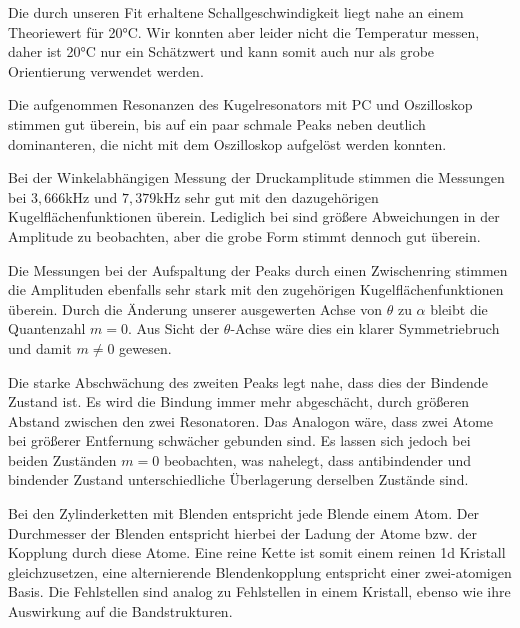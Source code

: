 Die durch unseren Fit erhaltene Schallgeschwindigkeit liegt nahe an einem Theoriewert für 20°C.
Wir konnten aber leider nicht die Temperatur messen, daher ist 20°C nur ein Schätzwert und kann somit auch nur als grobe Orientierung verwendet werden.

Die aufgenommen Resonanzen des Kugelresonators mit PC und Oszilloskop stimmen gut überein, bis auf ein paar schmale Peaks neben deutlich dominanteren, die nicht mit dem Oszilloskop aufgelöst werden konnten.

Bei der Winkelabhängigen Messung der Druckamplitude stimmen die Messungen bei $3,666$kHz und $7,379$kHz sehr gut mit den dazugehörigen Kugelflächenfunktionen überein.
Lediglich bei sind größere Abweichungen in der Amplitude zu beobachten, aber die grobe Form stimmt dennoch gut überein.

Die Messungen bei der Aufspaltung der Peaks durch einen Zwischenring stimmen die Amplituden ebenfalls sehr stark mit den zugehörigen Kugelflächenfunktionen überein.
Durch die Änderung unserer ausgewerten Achse von $\theta$ zu $\alpha$ bleibt die Quantenzahl $m=0$.
Aus Sicht der $\theta$-Achse wäre dies ein klarer Symmetriebruch und damit $m\neq 0$ gewesen.

Die starke Abschwächung des zweiten Peaks legt nahe, dass dies der Bindende Zustand ist.
Es wird die Bindung immer mehr abgeschächt, durch größeren Abstand zwischen den zwei Resonatoren.
Das Analogon wäre, dass zwei Atome bei größerer Entfernung schwächer gebunden sind.
Es lassen sich jedoch bei beiden Zuständen $m=0$ beobachten, was nahelegt, dass antibindender und bindender Zustand unterschiedliche Überlagerung derselben Zustände sind.

Bei den Zylinderketten mit Blenden entspricht jede Blende einem Atom.
Der Durchmesser der Blenden entspricht hierbei der Ladung der Atome bzw. der Kopplung durch diese Atome.
Eine reine Kette ist somit einem reinen 1d Kristall gleichzusetzen, eine alternierende Blendenkopplung entspricht einer zwei-atomigen Basis.
Die Fehlstellen sind analog zu Fehlstellen in einem Kristall, ebenso wie ihre Auswirkung auf die Bandstrukturen.